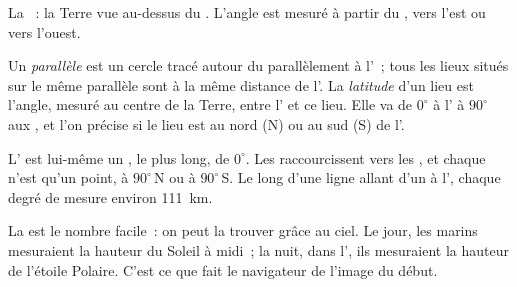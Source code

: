\begin{omfigure}
\begin{minipage}[t]{0.48\linewidth}
{\small La ~: la Terre vue au-dessus du . L'angle est
mesuré à partir du , vers l'est ou vers l'ouest.}
\end{minipage}
\end{omfigure}

\begin{definition}\label{def:g6:latitude-longitude:latitude}
Un \emph{parallèle} est un cercle tracé autour
du  parallèlement à l'~; tous les lieux situés sur le même
parallèle sont à la même distance de l'. La
\emph{latitude} d'un lieu est l'angle, mesuré au centre de
la Terre, entre l' et ce lieu. Elle va de $0^\circ$ à l' à
$90^\circ$ aux , et l'on précise si le lieu est au nord (N) ou au sud
(S) de l'.
\end{definition}

L' est lui-même un , le plus long, de  $0^\circ$.
Les  raccourcissent vers les , et chaque  n'est qu'un
point, à $90^\circ$\,N ou à $90^\circ$\,S. Le long d'une ligne allant d'un
 à l', chaque degré de  mesure environ \qty{111}{km}.

La  est le nombre facile~: on peut la trouver grâce au ciel. Le
jour, les marins mesuraient la hauteur du Soleil à midi~; la nuit, dans
l', ils mesuraient la hauteur de l'étoile Polaire. C'est ce
que fait le navigateur de l'image du début.

